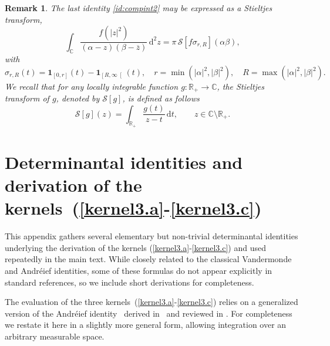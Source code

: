 \documentclass[pdflatex,sn-mathphys-num]{sn-jnl}
\theoremstyle{thmstyleone}
\newtheorem{remark}[theorem]{Remark}
\numberwithin{equation}{section}
\newcommand{\R}{\mathbb{R}}
\newcommand{\C}{\mathbb{C}}
\begin{document}
\begin{appendices}
\begin{remark}\label{stieltjes}
    The last identity \eqref{id:compint2} may be expressed as a Stieltjes transform,
\begin{equation}\label{stiel}
\int_{\C} \frac{f(|z|^2)}{(\alpha - z)(\beta - \overline{z})} \, \mathrm{d}^2 z 
= \pi\, \mathcal{S}[f  \sigma_{r,R}](\alpha\beta),
\end{equation}
with
\begin{equation}
\sigma_{r,R}\left(t\right) = \mathbf{1}_{[0, r]}\left(t\right) - \mathbf{1}_{\left[R, \infty\right[}(t), \quad r = \min(|\alpha|^2, |\beta|^2), \quad R = \max(|\alpha|^2, |\beta|^2).
\end{equation}
We recall that for any locally integrable function $ g : \R_+ \to \C $, the Stieltjes transform of $g$, denoted by $ \mathcal{S}[g] $, is defined as follows
\begin{equation}
\mathcal{S}[g](z) = \int_{\R_{+}}^{} \frac{g(t)}{z - t} \, \mathrm{d}t, \qquad z \in \C \setminus \R_+.
\end{equation}
\end{remark}

\section{Determinantal identities and derivation of the kernels~(\ref{kernel3.a}-\ref{kernel3.c})}\label{secA2}

This appendix gathers several elementary but non-trivial determinantal identities underlying the derivation of the kernels (\ref{kernel3.a}-\ref{kernel3.c}) and used repeatedly in the main text. While closely related to the classical Vandermonde and Andr\'eief identities, some of these formulas do not appear explicitly in standard references, so we include short derivations for completeness.
 
 
The evaluation of the three kernels~(\ref{kernel3.a}-\ref{kernel3.c}) relies on a generalized version of the Andr\'eief identity~\cite{andreevNoteRelationEntre1886} derived in~\cite[Appendix C.1]{kieburgDerivationDeterminantalStructures2010} and reviewed in \cite{forresterMeetAndreiefBordeaux2019}. For completeness we restate it here in a slightly more general form, allowing integration over an arbitrary measurable space.
 

\end{appendices}
\end{document}
